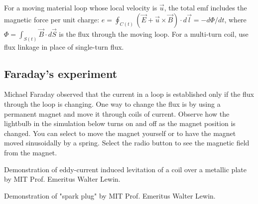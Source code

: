 \documentclass{ximera}
\begin{document}
For a moving material loop whose local velocity is $\vec{u}$, the total emf includes the magnetic force per unit charge: $e=\oint_{C(t)}(\vec{E}+\vec{u}\times\vec{B})\cdot d\vec{l}=-d\Phi/dt$, where $\Phi=\int_{S(t)}\vec{B}\cdot d\vec{S}$ is the flux through the moving loop. For a multi-turn coil, use flux linkage in place of single-turn flux.

\begin{example}
\subsection{Faraday's experiment}
Michael Faraday observed that the current in a loop is established only if the flux through the loop is changing. One way to change the flux is by using a permanent magnet and move it through coils of current. Observe how the lightbulb in the simulation below turns on and off as the magnet position is changed. You can select to move the magnet yourself or to have the magnet moved sinusoidally by a spring. Select the radio button to see the magnetic field from the magnet.

\begin{center}  
\end{center} 
\end{example}


\begin{example}
Demonstration of eddy-current induced levitation of a coil over a metallic plate by MIT Prof. Emeritus Walter Lewin.
\begin{center}  
\end{center} 
\end{example}





\begin{example}


Demonstration of "spark plug" by MIT Prof. Emeritus Walter Lewin.
\begin{center}  
\end{center} 


\end{example}





\end{document}
